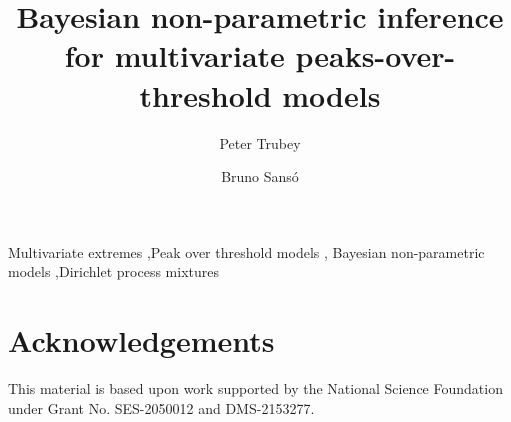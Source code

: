 \documentclass[12pt,authoryear]{elsarticle}
\begin{document}
\begin{frontmatter}
    \title{Bayesian non-parametric inference for multivariate peaks-over-threshold models}
    \author{Peter Trubey}

    \author{Bruno Sans\'o}
    \address{Department of Statistics, University of California, Santa Cruz,  USA}
    
    \begin{abstract}
        
    \end{abstract}

    \begin{keyword}
        Multivariate extremes \sep Peak over threshold models \sep
        Bayesian non-parametric models \sep Dirichlet process mixtures
    \end{keyword}
\end{frontmatter}











\section*{Acknowledgements}
This material is based upon work supported by the National Science Foundation under Grant No. SES-2050012 and DMS-2153277.



\end{document}
